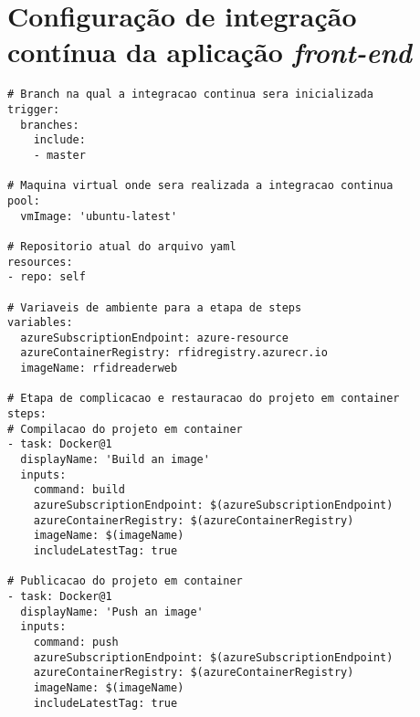 \section{Configuração de integração contínua da aplicação \textit{front-end}}

\begin{lstlisting}[language=docker-compose, label=ci-yaml-web]
# Branch na qual a integracao continua sera inicializada
trigger:
  branches:
    include:
    - master

# Maquina virtual onde sera realizada a integracao continua
pool:
  vmImage: 'ubuntu-latest'

# Repositorio atual do arquivo yaml
resources:
- repo: self

# Variaveis de ambiente para a etapa de steps
variables:
  azureSubscriptionEndpoint: azure-resource
  azureContainerRegistry: rfidregistry.azurecr.io
  imageName: rfidreaderweb

# Etapa de complicacao e restauracao do projeto em container
steps:
# Compilacao do projeto em container
- task: Docker@1
  displayName: 'Build an image'
  inputs:
    command: build
    azureSubscriptionEndpoint: $(azureSubscriptionEndpoint)
    azureContainerRegistry: $(azureContainerRegistry)
    imageName: $(imageName)
    includeLatestTag: true

# Publicacao do projeto em container
- task: Docker@1
  displayName: 'Push an image'
  inputs:
    command: push
    azureSubscriptionEndpoint: $(azureSubscriptionEndpoint)
    azureContainerRegistry: $(azureContainerRegistry)
    imageName: $(imageName)
    includeLatestTag: true
\end{lstlisting}